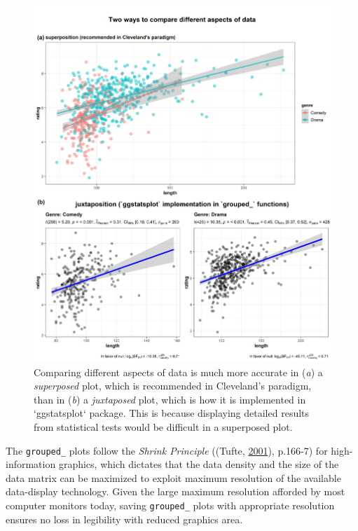 \documentclass[
]{article}
\begin{document}
\begin{figure}[H]
\includegraphics[width=1\linewidth]{./figures/paper-fig3-1} \caption{Comparing different aspects of data is much more accurate in (\textit{a}) a \textit{superposed} plot, which is recommended in Cleveland's paradigm, than in (\textit{b}) a \textit{juxtaposed} plot, which is how it is implemented in `ggstatsplot` package. This is because displaying detailed results from statistical tests would be difficult in a superposed plot.}\label{fig:fig3}
\end{figure}

The \texttt{grouped\_} plots follow the \emph{Shrink Principle}
((Tufte, \protect\hyperlink{ref-tufteVisualDisplayQuantitative2001}{2001}), p.166-7) for high-information graphics,
which dictates that the data density and the size of the data matrix can be
maximized to exploit maximum resolution of the available data-display
technology. Given the large maximum resolution afforded by most computer
monitors today, saving \texttt{grouped\_} plots with appropriate resolution ensures no
loss in legibility with reduced graphics area.
\end{document}
